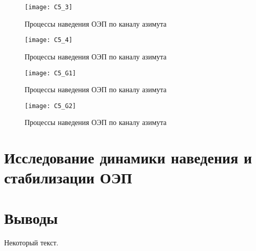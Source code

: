 \begin{figure}[ht]
	\centering
	\texttt{[image: C5\_3]} 
	\caption{Процессы наведения ОЭП по каналу азимута}
	\label{fig:az_true}
\end{figure}


\begin{figure}[ht]
	\centering
	\texttt{[image: C5\_4]} 
	\caption{Процессы наведения ОЭП по каналу азимута}
	\label{fig:az_true}
\end{figure}

\begin{figure}[ht]
	\centering
	\texttt{[image: C5\_G1]} 
	\caption{Процессы наведения ОЭП по каналу азимута}
	\label{fig:az_true}
\end{figure}
\begin{figure}[ht]
	\centering
	\texttt{[image: C5\_G2]} 
	\caption{Процессы наведения ОЭП по каналу азимута}
	\label{fig:az_true}
\end{figure}

\section{Исследование динамики наведения и стабилизации ОЭП} \label{ch:ch5/sect4}

\section{Выводы} \label{ch:ch5/sect5}
	


Некоторый текст.

\clearpage